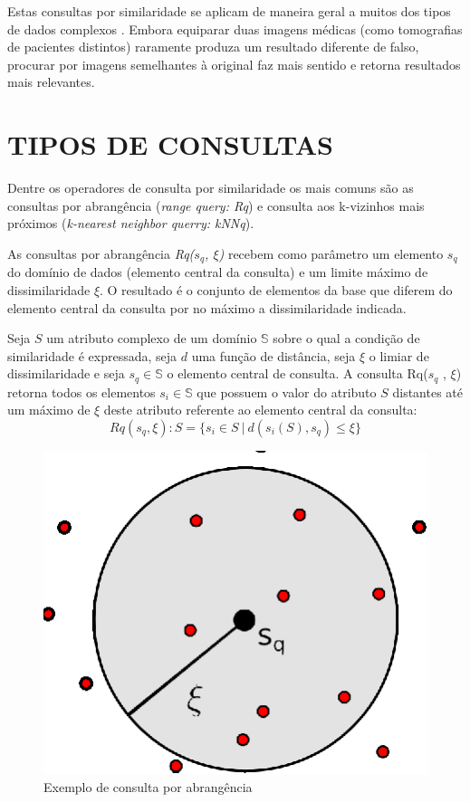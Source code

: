Estas consultas por similaridade se aplicam de maneira geral a muitos dos tipos de dados complexos \cite{Barioni2009}. Embora equiparar duas imagens médicas (como tomografias de pacientes distintos) 
raramente produza um resultado diferente de falso, procurar por imagens semelhantes à original faz mais sentido e retorna resultados mais relevantes.

\section{TIPOS DE CONSULTAS}
\label{sec:tiposconsultas}

Dentre os operadores de consulta por similaridade os mais comuns são as consultas por abrangência (\textit{range query: Rq}) e consulta aos k-vizinhos mais próximos (\textit{k-nearest neighbor querry: kNNq}).\par 

As consultas por abrangência \textit{Rq($s_q$, $\xi$)} recebem como parâmetro um elemento $s_q$ do domínio de dados (elemento central da consulta) e um limite máximo de dissimilaridade $\xi$. O resultado é o conjunto de 
elementos da base que diferem do elemento central da consulta por no máximo a dissimilaridade indicada.\par
\begin{mydef}
 \label{def:def_rq}
  Seja $S$ um atributo complexo de um domínio $\mathbb{S}$ sobre o qual a condição de similaridade é expressada, seja $d$ uma
  função de distância, seja $\xi$ o limiar de dissimilaridade e seja $s_q \in \mathbb{S}$ o elemento central de consulta. 
  A consulta Rq($s_q$ , $\xi$) retorna todos os elementos $s_i \in \mathbb{S}$ que possuem o valor do atributo $S$ distantes
  até um máximo de $\xi$ deste atributo referente ao elemento central da consulta: 
  \begin{equation} \label{eq:knnq}   
    Rq(s_q, \xi): S = \{s_i \in S \ |\ d(s_i(S), s_q) \leq \xi\}
  \end{equation}
\end{mydef}

\begin{figure}[H]	%
\centering
\includegraphics[width=.3\textwidth]{dados/figuras/rq.eps}
\caption{Exemplo de consulta por abrangência}
\label{fig:exemplorq}
\end{figure}

